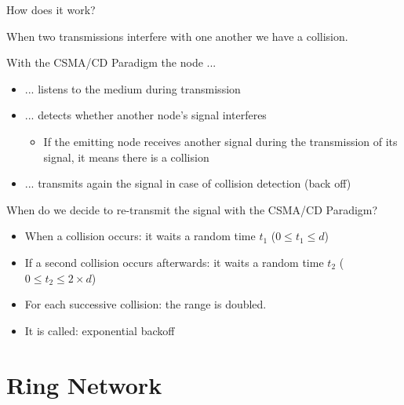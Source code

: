 \documentclass{beamer}[10pt, usepdftitle=false, handout]
\begin{document}
	
	\begin{frame}
	
	How does it work?	
	\vspace*{1em}
	
	When two transmissions interfere with one another we have a collision.
	\vspace*{0.5em}
	
	With the CSMA/CD Paradigm the node ... 
	\begin{itemize}
	\item{... listens to the medium during transmission}
	\item{... detects whether another node's signal interferes
	\begin{itemize}
		\item{If the emitting node receives another signal during the transmission of its signal, it means there is a collision}
	\end{itemize}
	}
	\item{... transmits again the signal in case of collision detection (back off)}
	\end{itemize}		
		
	\end{frame}
	
	\begin{frame}
	
	When do we decide to re-transmit the signal with the CSMA/CD Paradigm?
	\vspace*{1em}

	\begin{itemize}
	\item{When a collision occurs: it waits a random time $t_1$ ($0\leq t_1 \leq d$)}
	\item{If a second collision occurs afterwards: it waits a random time $t_2$ ($0\leq t_2\leq 2\times d$)}	
	\item{For each successive collision: the range is doubled.}
	\item{It is called: exponential backoff}
	\end{itemize}
	
	\end{frame}	
	
	\section{Ring Network}
	
\end{document}
